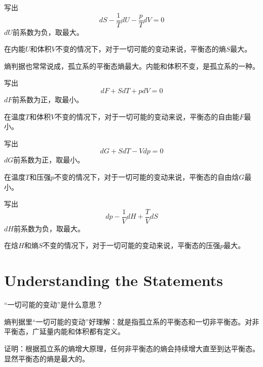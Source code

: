 \documentclass[CJK]{beamer}
\begin{document}
\begin{frame}
\bch
写出
$$dS - \frac{1}{T} dU - \frac{p}{T} dV = 0 $$
$dU$前系数为负，取最大。

在内能$U$和体积$V$不变的情况下，对于一切可能的变动来说，平衡态的熵$S$最大。

\skiplines

熵判据也常常说成，孤立系的平衡态熵最大。内能和体积不变，是孤立系的一种。
\ech
\end{frame}


\begin{frame}
\bch
写出
$$dF  + S dT + p dV = 0 $$
$dF$前系数为正，取最小。


在温度$T$和体积$V$不变的情况下，对于一切可能的变动来说，平衡态的自由能$F$最小。

\ech
\end{frame}


\begin{frame}
\bch
写出
$$dG + S dT - V dp = 0$$
$dG$前系数为正，取最小。

在温度$T$和压强$p$不变的情况下，对于一切可能的变动来说，平衡态的自由焓$G$最小。

\ech
\end{frame}


\begin{frame}
\bch
写出
$$dp - \frac{1}{V} dH + \frac{T}{V} dS $$
$dH$前系数为负，取最大。

在焓$H$和熵$S$不变的情况下，对于一切可能的变动来说，平衡态的压强$p$最大。

\ech
\end{frame}


\section{Understanding the Statements}

\begin{frame}
\bch
“一切可能的变动”是什么意思？

\ech
\end{frame}

\begin{frame}
\bch
熵判据里“一切可能的变动”好理解：就是指孤立系的平衡态和一切非平衡态。对非平衡态，广延量内能和体积都有定义。



证明：根据孤立系的熵增大原理，任何非平衡态的熵会持续增大直至到达平衡态。显然平衡态的熵是最大的。

\ech
\end{frame}
\end{document}
